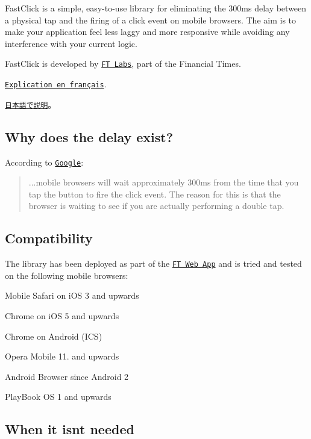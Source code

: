Fast\+Click is a simple, easy-\/to-\/use library for eliminating the 300ms delay between a physical tap and the firing of a {\ttfamily click} event on mobile browsers. The aim is to make your application feel less laggy and more responsive while avoiding any interference with your current logic.

Fast\+Click is developed by \href{http://labs.ft.com/}{\tt FT Labs}, part of the Financial Times.

\href{http://maxime.sh/2013/02/supprimer-le-lag-des-clics-sur-mobile-avec-fastclick/}{\tt Explication en français}.

\href{https://developer.mozilla.org/ja/docs/Mozilla/Firefox_OS/Apps/Tips_and_techniques#Make_events_immediate}{\tt 日本語で説明}。

\subsection*{Why does the delay exist?}

According to \href{https://developers.google.com/mobile/articles/fast_buttons}{\tt Google}\+:

\begin{quote}
...mobile browsers will wait approximately 300ms from the time that you tap the button to fire the click event. The reason for this is that the browser is waiting to see if you are actually performing a double tap. \end{quote}


\subsection*{Compatibility}

The library has been deployed as part of the \href{http://app.ft.com/}{\tt FT Web App} and is tried and tested on the following mobile browsers\+:


\begin{DoxyItemize}
\item Mobile Safari on i\+OS 3 and upwards
\item Chrome on i\+OS 5 and upwards
\item Chrome on Android (I\+CS)
\item Opera Mobile 11. and upwards
\item Android Browser since Android 2
\item Play\+Book OS 1 and upwards
\end{DoxyItemize}

\subsection*{When it isn\textquotesingle{}t needed}

